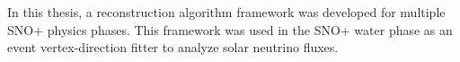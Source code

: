 In this thesis, a reconstruction algorithm framework was developed for multiple SNO+ physics phases. This framework was used in the SNO+ water phase as an event vertex-direction fitter to analyze solar neutrino fluxes.
